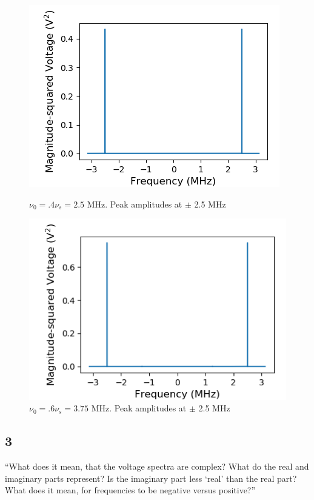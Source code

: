 \documentclass[a4paper]{article}
\begin{document}
\begin{figure}
\centering
\begin{minipage}{.5\textwidth}
	\centering
	\includegraphics[width=.8\linewidth]{5-2/pow4}
	\caption{$\nu_0 = .4 \nu_s = 2.5$ MHz. Peak amplitudes at $\pm$ 2.5 MHz}
	\label{fig:NyPw4}
\end{minipage}%
\begin{minipage}{.5\textwidth}
	\centering
	\includegraphics[width=.8\linewidth]{5-2/pow6}
	\caption{$\nu_0 = .6 \nu_s = 3.75$ MHz. Peak amplitudes at $\pm$ 2.5 MHz}
	\label{fig:NyPw6}
\end{minipage}
\end{figure}

\subsection{3}

``What does it mean, that the voltage spectra are complex? What do the real and imaginary
parts represent? Is the imaginary part less ‘real’ than the real part? What does it mean, for
frequencies to be negative versus positive?''
\end{document}
